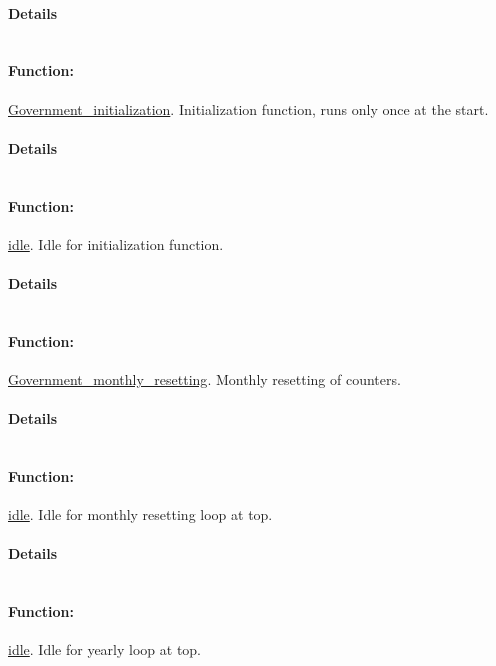 \documentclass[a4paper,11pt]{article}
\begin{document}
\paragraph{Details}
\begin{verbatim}
\end{verbatim}
\paragraph{Function:}\url{Government_initialization}.
Initialization function, runs only once at the start.
\paragraph{Details}
\begin{verbatim}
\end{verbatim}
\paragraph{Function:}\url{idle}.
Idle for initialization function.
\paragraph{Details}
\begin{verbatim}
\end{verbatim}
\paragraph{Function:}\url{Government_monthly_resetting}.
Monthly resetting of counters.
\paragraph{Details}
\begin{verbatim}
\end{verbatim}
\paragraph{Function:}\url{idle}.
Idle for monthly resetting loop at top.
\paragraph{Details}
\begin{verbatim}
\end{verbatim}
\paragraph{Function:}\url{idle}.
Idle for yearly loop at top.
\end{document}
